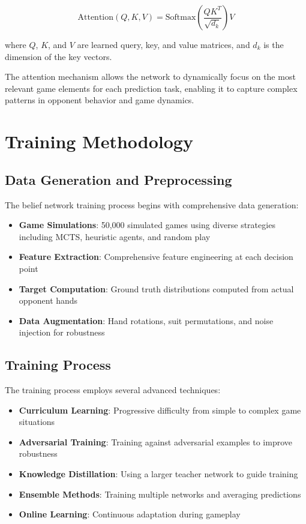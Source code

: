 \documentclass[conference]{IEEEtran}
\begin{document}
\begin{equation}
\text{Attention}(Q, K, V) = \text{Softmax}\left(\frac{QK^T}{\sqrt{d_k}}\right)V
\end{equation}

where $Q$, $K$, and $V$ are learned query, key, and value matrices, and $d_k$ is the dimension of the key vectors.

The attention mechanism allows the network to dynamically focus on the most relevant game elements for each prediction task, enabling it to capture complex patterns in opponent behavior and game dynamics.

\section{Training Methodology}

\subsection{Data Generation and Preprocessing}

The belief network training process begins with comprehensive data generation:

\begin{itemize}
    \item \textbf{Game Simulations}: 50,000 simulated games using diverse strategies including MCTS, heuristic agents, and random play
    \item \textbf{Feature Extraction}: Comprehensive feature engineering at each decision point
    \item \textbf{Target Computation}: Ground truth distributions computed from actual opponent hands
    \item \textbf{Data Augmentation}: Hand rotations, suit permutations, and noise injection for robustness
\end{itemize}

\subsection{Training Process}

The training process employs several advanced techniques:

\begin{itemize}
    \item \textbf{Curriculum Learning}: Progressive difficulty from simple to complex game situations
    \item \textbf{Adversarial Training}: Training against adversarial examples to improve robustness
    \item \textbf{Knowledge Distillation}: Using a larger teacher network to guide training
    \item \textbf{Ensemble Methods}: Training multiple networks and averaging predictions
    \item \textbf{Online Learning}: Continuous adaptation during gameplay
\end{itemize}
\end{document}
